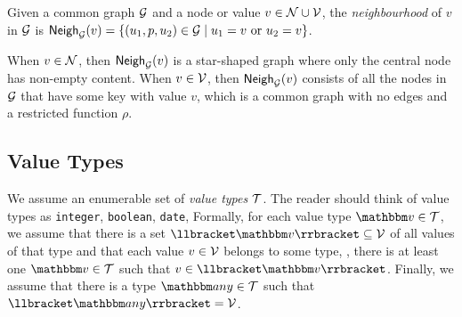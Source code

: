 \begin{definition}[Neighbourhood]
  Given a common graph $\mathcal{G}$ and a node or value $v \in \mathcal{N} \cup \mathcal{V}$,
  the \emph{neighbourhood} of $v$ in $\mathcal{G}$ is $\mathsf{Neigh}_{\mathcal{G}}(v) = \left\{
  (u_1, p, u_2) \in \mathcal{G} \mid u_1 = v \text{ or } u_2 = v \right\}$.
\end{definition}


When $v \in \mathcal{N}$, then $\mathsf{Neigh}_{\mathcal{G}}(v)$ is a star-shaped graph
where only the central node has non-empty content.
When $v \in \mathcal{V}$, then $\mathsf{Neigh}_{\mathcal{G}}(v)$ consists of all the nodes in
$\mathcal{G}$ that have some key with value $v$, which is a common graph with no
edges and a restricted function $\rho$.



\subsection{Value Types}

We assume an enumerable set of \emph{value types} $\mathcal{T}$.
The reader should think of value types as \texttt{integer}, \texttt{boolean},
\texttt{date}, \etc
Formally, for each value type $\vtype \in \ValueTypes$, we assume that there is
a set $\sem{\vtype} \subseteq \Values$ of all values of that type and that each
value $v \in \mathcal{V}$ belongs to some type, \ie, there is at least one $\vtype
\in \ValueTypes$ such that $v \in \sem{\vtype}$.
Finally, we assume that there is a type $\any \in \ValueTypes$ such that
$\sem{\any} = \Values$.


